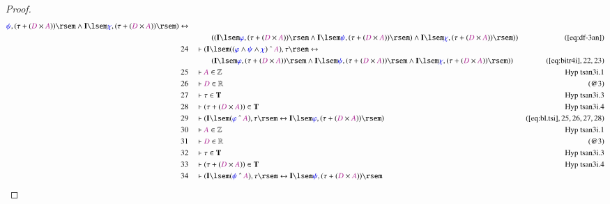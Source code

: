 \begin{proof}
\begin{align}
      \mw{\psi} , ( \tau + ( \mc{D} \times \mc{A} ) ) \rsem
      \wedge \mathbf{I} \lsem \mw{\chi} , ( \tau + ( \mc{D}
      \times \mc{A} ) ) \rsem ) \leftrightarrow  \notag \\ & & & \qquad
     ( (
      \mathbf{I} \lsem \mw{\varphi} , ( \tau + ( \mc{D}
      \times \mc{A} ) ) \rsem \wedge \mathbf{I} \lsem
      \mw{\psi} , ( \tau + ( \mc{D} \times \mc{A} ) ) \rsem
      ) \wedge \mathbf{I} \lsem \mw{\chi} , ( \tau + (
      \mc{D} \times \mc{A} ) ) \rsem )
      )&(\mbox{\ref{eq:df-3an}})\notag
  \\ 24 &&  & \vdash ( \mathbf{I} \lsem ( ( \mw{\varphi} \wedge \mw{\psi}
      \wedge \mw{\chi} ) ~\string^~ \mc{A} ) , \tau \rsem
      \leftrightarrow  \notag \\ & & & \qquad
     ( \mathbf{I} \lsem \mw{\varphi} , (
      \tau + ( \mc{D} \times \mc{A} ) ) \rsem \wedge
      \mathbf{I} \lsem \mw{\psi} , ( \tau + ( \mc{D} \times
      \mc{A} ) ) \rsem \wedge \mathbf{I} \lsem \mw{\chi} ,
      ( \tau + ( \mc{D} \times \mc{A} ) ) \rsem )
      )&(\mbox{\ref{eq:bitr4i}},22,23)\notag
  \\ 25 &&  & \vdash \mc{A} \in
      \mathbb{Z}&\text{Hyp~tsan3i.1}\notag%
  \\ 26 &&  & \vdash \mc{D} \in \mathbb{R}&(@3)\notag
  \\ 27 &&  & \vdash \tau \in \mathbf{T}&\text{Hyp~tsan3i.3}\notag%
  \\ 28 &&  & \vdash ( \tau + ( \mc{D} \times \mc{A} ) ) \in
      \mathbf{T}&\text{Hyp~tsan3i.4}\notag%
  \\ 29 &&  & \vdash ( \mathbf{I} \lsem ( \mw{\varphi} ~\string^~ \mc{A} ) ,
      \tau \rsem \leftrightarrow \mathbf{I} \lsem
      \mw{\varphi} , ( \tau + ( \mc{D} \times \mc{A} ) )
      \rsem )&(\mbox{\ref{eq:bl.tsi}},25,26,27,28)\notag
  \\ 30 &&  & \vdash \mc{A} \in
      \mathbb{Z}&\text{Hyp~tsan3i.1}\notag%
  \\ 31 &&  & \vdash \mc{D} \in \mathbb{R}&(@3)\notag
  \\ 32 &&  & \vdash \tau \in \mathbf{T}&\text{Hyp~tsan3i.3}\notag%
  \\ 33 &&  & \vdash ( \tau + ( \mc{D} \times \mc{A} ) ) \in
      \mathbf{T}&\text{Hyp~tsan3i.4}\notag%
  \\ 34 &&  & \vdash ( \mathbf{I} \lsem ( \mw{\psi} ~\string^~ \mc{A} ) , \tau
      \rsem \leftrightarrow \mathbf{I} \lsem \mw{\psi} , (
      \tau + ( \mc{D} \times \mc{A} ) ) \rsem

\end{align}
\end{proof}
